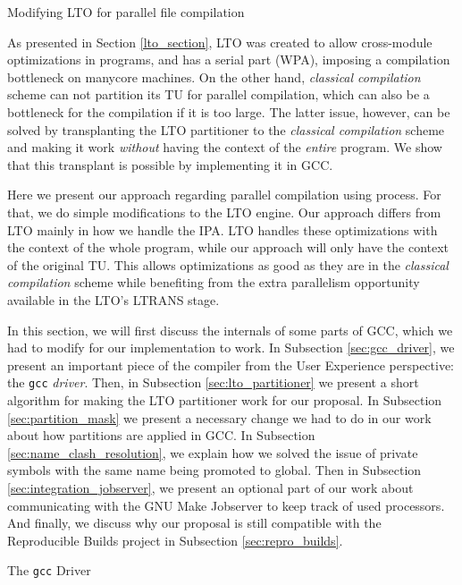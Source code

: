 \begin{section}{Modifying LTO for parallel file compilation}\label{sec:parallel_lto}

As presented in Section \ref{lto_section}, LTO was created to allow
cross-module optimizations in programs, and has a serial part (WPA), imposing a
compilation bottleneck on manycore machines. On the other hand, \emph{classical
compilation} scheme can not partition its TU for parallel compilation, which
can also be a bottleneck for the compilation if it is too large.  The latter
issue, however, can be solved by transplanting the LTO partitioner to the
\emph{classical compilation} scheme and making it work \textit{without} having
the context of the \textit{entire} program. We show that this transplant is
possible by implementing it in GCC.

Here we present our approach regarding parallel compilation using process. For
that, we do simple modifications to the LTO engine.  Our approach differs from
LTO mainly in how we handle the IPA.  LTO handles these optimizations with the
context of the whole program, while our approach will only have the context of
the original TU.  This allows optimizations as good as they are in the
\emph{classical compilation} scheme while benefiting from the extra parallelism
opportunity available in the LTO's LTRANS stage.

In this section, we will first discuss the internals of some parts of GCC,
which we had to modify for our implementation to work. In Subsection
\ref{sec:gcc_driver}, we present an important piece of the compiler from the
User Experience perspective: the \texttt{gcc} \textit{driver}. Then, in
Subsection \ref{sec:lto_partitioner} we present a short algorithm for making
the LTO partitioner work for our proposal. In Subsection
\ref{sec:partition_mask} we present a necessary change we had to do in our work
about how partitions are applied in GCC. In
Subsection \ref{sec:name_clash_resolution}, we explain how we solved the issue
of private symbols with the same name being promoted to global.
Then in Subsection \ref{sec:integration_jobserver}, we present an optional part
of our work about communicating with the GNU Make Jobserver to keep track of
used processors. And finally, we discuss why our proposal is still compatible
with the Reproducible Builds project in Subsection \ref{sec:repro_builds}.

\begin{subsection}{The \texttt{gcc} Driver}\label{sec:gcc_driver}


\end{subsection}
\end{section}
